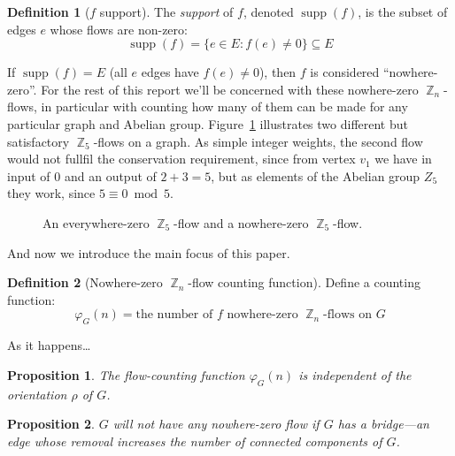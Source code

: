 \documentclass{amsart}
\DeclareMathOperator{\Z}{\mathbb{Z}}
\DeclareMathOperator{\sgsupp}{supp}
\theoremstyle{plain}
\newtheorem{prop*}{Proposition}
\theoremstyle{remark}
\theoremstyle{definition}
\newtheorem*{definition*}{Definition}
\newenvironment{prop}%
  {\begin{leftbar}\begin{prop*}
}{%
  \end{prop*}\end{leftbar}
}
\newenvironment{definition}%
  {\begin{leftbar}\begin{definition*}
}{%
  \end{definition*}\end{leftbar}
}
\begin{document}
\begin{definition}[$f$ support]
  The \emph{support} of $f$, denoted $\sgsupp(f)$, is the subset of edges $e$
  whose flows are non-zero:
  \[
    \sgsupp(f)=\{e\in E:f(e)\ne 0\}\subseteq E
  \]
\end{definition}
If $\sgsupp(f)=E$ (all $e$ edges have $f(e)\ne0$), then $f$ is considered
``nowhere-zero''. For the rest of this report we'll be concerned with these
nowhere-zero $\Z_n$-flows, in particular with counting how many of them can be
made for any particular graph and Abelian group.
%
Figure~\ref{fig:graph-flows} illustrates two different but satisfactory
$\Z_5$-flows on a graph.
As simple integer weights, the second flow would not fullfil the conservation
requirement, since from vertex $v_1$ we have in input of 0 and an output of
$2+3=5$,
but as elements of the Abelian group $Z_5$ they work, since
$5\equiv 0\bmod 5$.
\begin{figure}[ht]
  \hspace{1in}
  \caption{An everywhere-zero $\Z_5$-flow and a nowhere-zero $\Z_5$-flow.}\label{fig:graph-flows}
\end{figure}

And now we introduce the main focus of this paper.
\begin{definition}[Nowhere-zero $\Z_n$-flow counting function]
  Define a counting function:
  \[
    \varphi_G(n)=\text{the number of $f$ nowhere-zero $\Z_n$-flows on $G$}
  \]
\end{definition}
As it happens\ldots
\begin{prop}
  The flow-counting function $\varphi_G(n)$ is independent of the orientation
  $\rho$ of $G$.
\end{prop}
\begin{prop}
  $G$ will not have any nowhere-zero flow if $G$ has a \emph{bridge}---an edge
  whose removal increases the number of connected components of $G$.
\end{prop}
\end{document}
